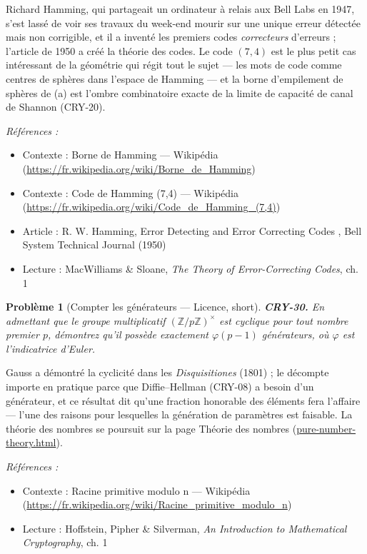\documentclass[11pt]{article}
\newtheorem{problem}{Problème}
\newenvironment{refs}{\par\small\noindent\emph{Références :}\begin{itemize}\setlength\itemsep{0pt}}{\end{itemize}\normalsize}
\begin{document}
\noindent Richard Hamming, qui partageait un ordinateur à relais aux Bell Labs en
1947, s'est lassé de voir ses travaux du week-end mourir sur une unique erreur détectée mais
non corrigible, et il a inventé les premiers codes \textit{correcteurs} d'erreurs ; l'article
de 1950 a créé la théorie des codes. Le code $(7,4)$ est le plus petit cas intéressant de
la géométrie qui régit tout le sujet --- les mots de code comme centres de sphères dans
l'espace de Hamming --- et la borne d'empilement de sphères de (a) est l'ombre combinatoire
exacte de la limite de capacité de canal de Shannon (CRY-20).

\begin{refs}
\item Contexte : Borne de Hamming --- Wikipédia (\url{https://fr.wikipedia.org/wiki/Borne_de_Hamming})
\item Contexte : Code de Hamming (7,4) --- Wikipédia (\url{https://fr.wikipedia.org/wiki/Code_de_Hamming_(7,4)})
\item Article : R. W. Hamming, \og{} Error Detecting and Error Correcting Codes \fg{}, Bell System Technical Journal (1950)
\item Lecture : MacWilliams \& Sloane, \textit{The Theory of Error-Correcting Codes}, ch. 1
\end{refs}

\bigskip

\begin{problem}[{Compter les générateurs --- Licence, short}]
\textbf{CRY-30.} En admettant que le groupe multiplicatif
$(\mathbb{Z}/p\mathbb{Z})^\times$ est cyclique pour tout nombre premier $p$, démontrez
qu'il possède exactement $\varphi(p-1)$ générateurs, où $\varphi$ est l'indicatrice
d'Euler.
\end{problem}

\noindent Gauss a démontré la cyclicité dans les \textit{Disquisitiones} (1801) ;
le décompte importe en pratique parce que Diffie--Hellman (CRY-08) a besoin d'un générateur,
et ce résultat dit qu'une fraction honorable des éléments fera l'affaire --- l'une des raisons
pour lesquelles la génération de paramètres est faisable. La théorie des nombres se poursuit
sur la page Théorie des nombres (\url{pure-number-theory.html}).

\begin{refs}
\item Contexte : Racine primitive modulo n --- Wikipédia (\url{https://fr.wikipedia.org/wiki/Racine_primitive_modulo_n})
\item Lecture : Hoffstein, Pipher \& Silverman, \textit{An Introduction to Mathematical Cryptography}, ch. 1
\end{refs}
\end{document}
